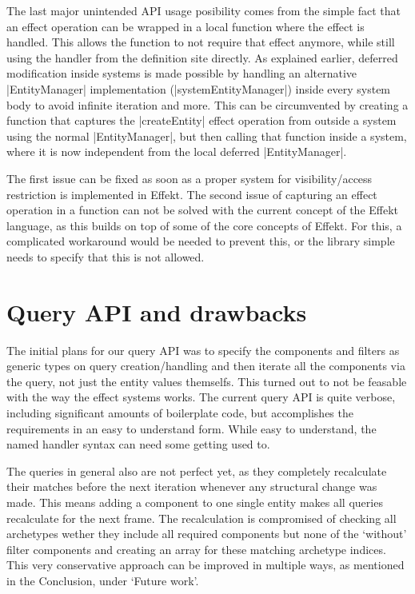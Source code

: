The last major unintended API usage posibility comes from the simple fact that an effect operation can be wrapped in a local function where the effect is handled. This allows the function to not require that effect anymore, while still using the handler from the definition site directly. As explained earlier, deferred modification inside systems is made possible by handling an alternative |EntityManager| implementation (|systemEntityManager|) inside every system body to avoid infinite iteration and more. This can be circumvented by creating a function that captures the |createEntity| effect operation from outside a system using the normal |EntityManager|, but then calling that function inside a system, where it is now independent from the local deferred |EntityManager|.

The first issue can be fixed as soon as a proper system for visibility/access restriction is implemented in Effekt. The second issue of capturing an effect operation in a function can not be solved with the current concept of the Effekt language, as this builds on top of some of the core concepts of Effekt. For this, a complicated workaround would be needed to prevent this, or the library simple needs to specify that this is not allowed.

\section{Query API and drawbacks}

The initial plans for our query API was to specify the components and filters as generic types on query creation/handling and then iterate all the components via the query, not just the entity values themselfs. This turned out to not be feasable with the way the effect systems works. The current query API is quite verbose, including significant amounts of boilerplate code, but accomplishes the requirements in an easy to understand form. While easy to understand, the named handler syntax can need some getting used to.

The queries in general also are not perfect yet, as they completely recalculate their matches before the next iteration whenever any structural change was made. This means adding a component to one single entity makes all queries recalculate for the next frame. The recalculation is compromised of checking all archetypes wether they include all required components but none of the `without' filter components and creating an array for these matching archetype indices. This very conservative approach can be improved in multiple ways, as mentioned in the Conclusion, under `Future work'.

